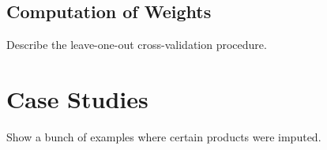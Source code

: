 \documentclass[nojss]{jss}\usepackage[]{graphicx}\usepackage[]{color}
\begin{document}
\subsection{Computation of Weights}

Describe the leave-one-out cross-validation procedure.

\section{Case Studies}

Show a bunch of examples where certain products were imputed.

% 
\end{document}
